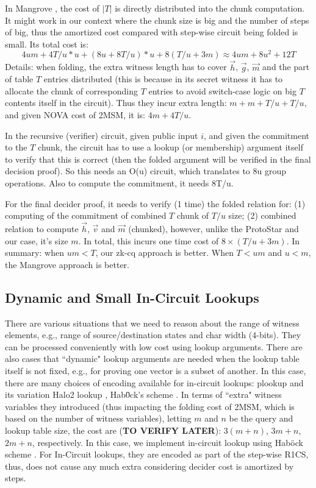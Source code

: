 {{In Mangrove \cite{Mangrove}, the cost of $|T|$ is directly
distributed into the chunk computation. It might work in our context where
the chunk size is big and the number of steps of big, thus the
amortized cost compared with step-wise circuit being folded
is small. Its total cost is:
\[
	4um + 4T/u*u + (8u + 8T/u)*u + 8(T/u + 3m)
	\approx 4um + 8u^2 + 12T
\]
Details: when folding, the extra witness length has to cover
$\vec{h}$, $\vec{g}$, $\vec{m}$ and the part of table $T$ entries
distributed (this is because in its secret witness it has to allocate
the chunk of corresponding $T$ entries to avoid switch-case logic
on big $T$ contents itself in the circuit). Thus they incur extra length: 
$m + m + T/u + T/u$, and given NOVA cost of 2MSM,
it is: $4m + 4T/u$. 

In the recursive (verifier) circuit, given public input $i$,
and given the commitment to the $T$ chunk, the circuit has to
use a lookup (or membership) 
argument itself to verify that this is correct (then
the folded argument will be verified in the final decision proof).
So this needs an O(u) circuit, which translates to 8u group operations.
Also to compute the commitment, it needs 8T/u.

For the final decider proof, it needs to verify (1 time)
the folded relation for: (1) computing of the 
commitment of combined $T$ chunk of $T/u$ size; (2)
combined relation to compute $\vec{h}$, $\vec{v}$ and $\vec{m}$ (chunked),
however, unlike the ProtoStar and our case, it's size $m$.
In total, this incurs one time cost of $8\times (T/u + 3m)$.
In summary: when $um<T$, our zk-cq approach is better.
When $T<um$ and $u<m$, the Mangrove approach is better.

\subsection{Dynamic and Small In-Circuit Lookups}
There are various situations that we need to reason about the range
of witness elements, e.g., range of source/destination states and
char width (4-bits). They can be processed conveniently with low cost
using lookup arguments. There are also cases that
``dynamic" lookup arguments are needed when the lookup table itself
is not fixed, e.g., for proving one vector is a subset
of another. In this case, there are many choices of encoding available
for in-circuit lookups: plookup \cite{plookup} and its variation
Halo2 lookup \cite{Halo2}, Hab\"{0}ck's scheme \cite{Hab22}.
In terms of ``extra" witness variables they introduced (thus
impacting the folding cost of 2MSM, which is based on the
number of witness variables), letting $m$ and $n$ be the
query and lookup table size, the cost are ({\bf TO VERIFY LATER}):
$3(m+n)$,  $3m+n$, $2m+n$, respectively. In this case, we
implement in-circuit lookup using Hab\"{o}ck scheme \cite{Hab22}.
For In-Circuit lookups, they are encoded as part of the step-wise
R1CS, thus, does not cause any much extra considering decider cost
is amortized by steps.

}}
